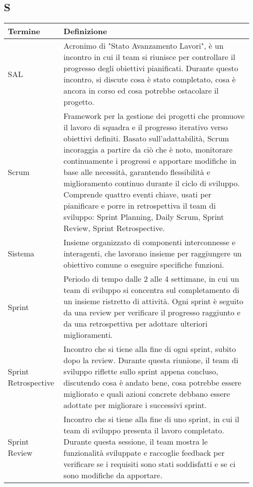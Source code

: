\documentclass[10pt]{article}
\begin{document}
\subsection{S} %
\begin{longtable}{|>{\centering\arraybackslash}m{2.5cm}|>{\arraybackslash}m{12.5cm}|}
\hline
\rowcolor[gray]{0.8}
\textbf{Termine} & \textbf{Definizione}\\
\endhead
\hline
SAL & Acronimo di "Stato Avanzamento Lavori", è un incontro in cui il team si riunisce per controllare il progresso degli obiettivi pianificati. Durante questo incontro, si discute cosa è stato completato, cosa è ancora in corso ed cosa potrebbe ostacolare il progetto.\\
\hline
Scrum & Framework per la gestione dei progetti che promuove il lavoro di squadra e il progresso iterativo verso obiettivi definiti. Basato sull'adattabilità, Scrum incoraggia a partire da ciò che è noto, monitorare continuamente i progressi e apportare modifiche in base alle necessità, garantendo flessibilità e miglioramento continuo durante il ciclo di sviluppo. Comprende quattro eventi chiave, usati per pianificare e porre in retrospettiva il team di sviluppo: Sprint Planning, Daily Scrum, Sprint Review, Sprint Retrospective.\\
\hline
Sistema & Insieme organizzato di componenti interconnesse e interagenti, che lavorano insieme per raggiungere un obiettivo comune o eseguire specifiche funzioni.\\
\hline
Sprint & Periodo di tempo dalle 2 alle 4 settimane, in cui un team di sviluppo si concentra sul completamento di un insieme ristretto di attività. Ogni sprint è seguito da una review per verificare il progresso raggiunto e da una retrospettiva per adottare ulteriori miglioramenti.\\
\hline
Sprint Retrospective & Incontro che si tiene alla fine di ogni sprint, subito dopo la review. Durante questa riunione, il team di sviluppo riflette sullo sprint appena concluso, discutendo cosa è andato bene, cosa potrebbe essere migliorato e quali azioni concrete debbano essere adottate per migliorare i successivi sprint.\\
\hline
Sprint Review & Incontro che si tiene alla fine di uno sprint, in cui il team di sviluppo presenta il lavoro completato. Durante questa sessione, il team mostra le funzionalità sviluppate e raccoglie feedback per verificare se i requisiti sono stati soddisfatti e se ci sono modifiche da apportare.\\
\hline

\end{longtable}
\end{document}
